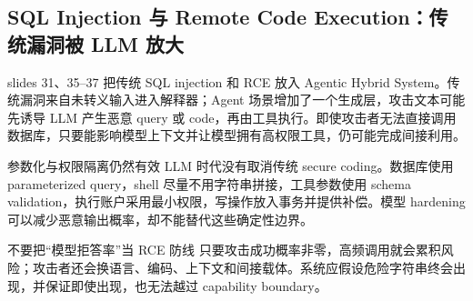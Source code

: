 \subsection{SQL Injection 与 Remote Code Execution：传统漏洞被 LLM 放大}

slides 31、35--37 把传统 SQL injection 和 RCE 放入 Agentic Hybrid System。传统漏洞来自未转义输入进入解释器；Agent 场景增加了一个生成层，攻击文本可能先诱导 LLM 产生恶意 query 或 code，再由工具执行。即使攻击者无法直接调用数据库，只要能影响模型上下文并让模型拥有高权限工具，仍可能完成间接利用。


\begin{importantbox}{参数化与权限隔离仍然有效}
LLM 时代没有取消传统 secure coding。数据库使用 parameterized query，shell 尽量不用字符串拼接，工具参数使用 schema validation，执行账户采用最小权限，写操作放入事务并提供补偿。模型 hardening 可以减少恶意输出概率，却不能替代这些确定性边界。
\end{importantbox}

\begin{warningbox}{不要把“模型拒答率”当 RCE 防线}
只要攻击成功概率非零，高频调用就会累积风险；攻击者还会换语言、编码、上下文和间接载体。系统应假设危险字符串终会出现，并保证即使出现，也无法越过 capability boundary。
\end{warningbox}

